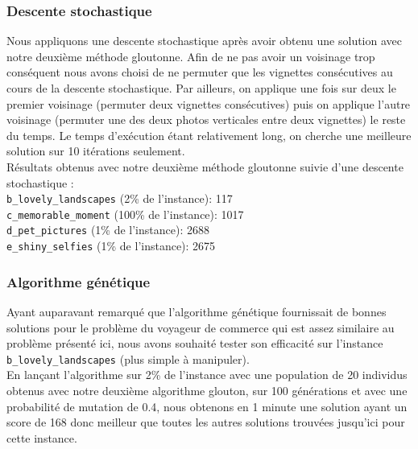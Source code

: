 \documentclass[12pt,a4paper]{article}
\begin{document}
\vspace{1\baselineskip}

\subsubsection{Descente stochastique}

\vspace{1\baselineskip}

\noindent Nous appliquons une descente stochastique après avoir obtenu une solution avec notre deuxième méthode gloutonne. Afin de ne pas avoir un voisinage trop conséquent nous avons choisi de ne permuter que les vignettes consécutives au cours de la descente stochastique. Par ailleurs, on applique une fois sur deux le premier voisinage (permuter deux vignettes consécutives) puis on applique l'autre voisinage (permuter une des deux photos verticales entre deux vignettes) le reste du temps. Le temps d'exécution étant relativement long, on cherche une meilleure solution sur 10 itérations seulement.
\vspace{.5\baselineskip}\\
Résultats obtenus avec notre deuxième méthode gloutonne suivie d'une descente stochastique :
\vspace{.5\baselineskip}\\
\verb|b_lovely_landscapes| (2\% de l'instance): 117  \\
\verb|c_memorable_moment| (100\% de l'instance): 1017 \\ 
\verb|d_pet_pictures| (1\% de l'instance): 2688  \\
\verb|e_shiny_selfies| (1\% de l'instance): 2675
\vspace{1\baselineskip}

\subsubsection{Algorithme génétique}

\vspace{1\baselineskip}

\noindent Ayant auparavant remarqué que l'algorithme génétique fournissait de bonnes solutions pour le problème du voyageur de commerce qui est assez similaire au problème présenté ici, nous avons souhaité tester son efficacité sur l'instance \verb|b_lovely_landscapes| (plus simple à manipuler).\\
En lançant l'algorithme sur 2\% de l'instance avec une population de 20 individus obtenus avec notre deuxième algorithme glouton, sur 100 générations et avec une probabilité de mutation de 0.4, nous obtenons en 1 minute une solution ayant un score de 168 donc meilleur que toutes les autres solutions trouvées jusqu'ici pour cette instance.
 
\end{document}
